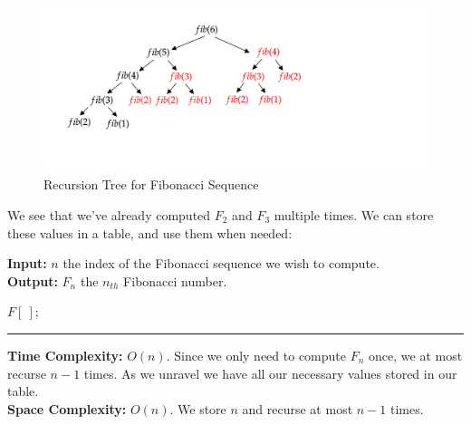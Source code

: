 \begin{figure}[h]


\hspace{5em} \includegraphics[width=1\textwidth]{Sections/dp/fib.png}

\vspace{-3em}
\caption{Recursion Tree for Fibonacci Sequence}
\label{fig:fib}
\end{figure}

\noindent
We see that we've already computed $F_2$ and $F_3$ multiple times. We can store these values in a table, and use them when needed:

\begin{Func}

    \textbf{Input:} $n$ the index of the Fibonacci sequence we wish to compute.\\
    \textbf{Output:} $F_n$ the $n_{th}$ Fibonacci number.\\

    \vspace{-.5em}
    \begin{algorithm}[H]
        \SetAlgoLined
        $F[\ ]$; 
    \end{algorithm}
    \rule{\textwidth}{0.4pt}
    \textbf{Time Complexity:} $O(n)$. Since we only need to compute $F_n$ once, we at most recurse $n-1$ times. As 
    we unravel we have all our necessary values stored in our table.\\
    \textbf{Space Complexity:} $O(n)$. We store $n$ and recurse at most $n-1$ times.
\end{Func}


